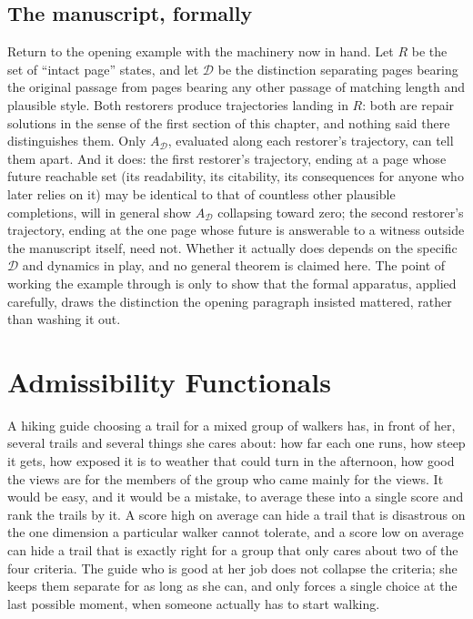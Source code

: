 \documentclass[11pt]{report}
\begin{document}
\section*{The manuscript, formally}

Return to the opening example with the machinery now in hand. Let $R$
be the set of ``intact page'' states, and let $\mathcal{D}$ be the
distinction separating pages bearing the original passage from pages
bearing any other passage of matching length and plausible style. Both
restorers produce trajectories landing in $R$: both are repair
solutions in the sense of the first section of this chapter, and
nothing said there distinguishes them. Only $A_{\mathcal D}$, evaluated
along each restorer's trajectory, can tell them apart. And it does:
the first restorer's trajectory, ending at a page whose
future reachable set (its readability, its citability, its
consequences for anyone who later relies on it) may be identical to
that of countless other plausible completions, will in general show
$A_{\mathcal D}$ collapsing toward zero; the second restorer's
trajectory, ending at the one page whose future is answerable to a
witness outside the manuscript itself, need not. Whether it actually
does depends on the specific $\mathcal D$ and dynamics in play, and no
general theorem is claimed here. The point of working the example
through is only to show that the formal apparatus, applied carefully,
draws the distinction the opening paragraph insisted mattered, rather
than washing it out.

\chapter{Admissibility Functionals}

A hiking guide choosing a trail for a mixed group of walkers has, in
front of her, several trails and several things she cares about: how
far each one runs, how steep it gets, how exposed it is to weather that
could turn in the afternoon, how good the views are for the members of
the group who came mainly for the views. It would be easy, and it
would be a mistake, to average these into a single score and rank the
trails by it. A score high on average can hide a trail that is
disastrous on the one dimension a particular walker cannot tolerate,
and a score low on average can hide a trail that is exactly right for
a group that only cares about two of the four criteria. The guide who
is good at her job does not collapse the criteria; she keeps them
separate for as long as she can, and only forces a single choice at
the last possible moment, when someone actually has to start walking.
\end{document}
